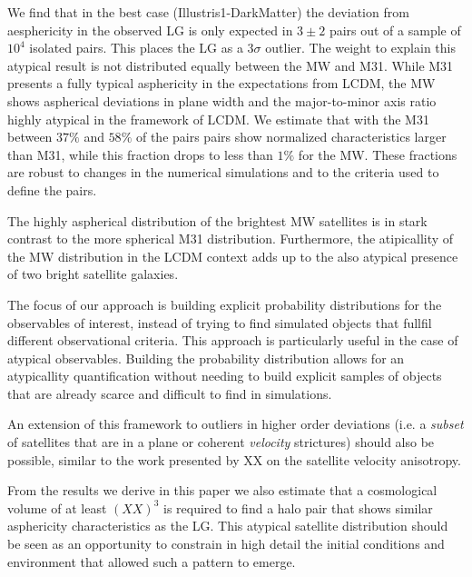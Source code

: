 \documentclass[a4paper,fleqn,usenatbib]{mnras}
\begin{document}
We find that in the best case (Illustris1-DarkMatter) the deviation
from aesphericity in the observed LG is only  expected in $3\pm2$
pairs out of a sample of $10^4$ isolated pairs. This places the LG as
a $3\sigma$ outlier.   
The weight to explain this atypical result is not distributed equally
between the MW and M31. 
While M31 presents a fully typical asphericity in the expectations
from LCDM, the MW shows aspherical deviations in plane width and the
major-to-minor axis ratio highly atypical in the 
framework of LCDM. 
We estimate that with the M31 between $37\%$ and $58\%$ of the pairs
pairs show normalized characteristics larger than M31, while
this fraction drops to less than $1\%$ for the MW.
These fractions are robust to changes in the numerical simulations and to
the criteria used to define the pairs.


The highly aspherical distribution of the brightest MW satellites is
in stark contrast to the more spherical M31 distribution.
Furthermore, the atipicallity of the MW distribution in the LCDM
context adds up to the also atypical presence of two bright satellite
galaxies.


The focus of our approach is building explicit probability
distributions for the observables of interest, instead of trying to
find simulated objects that fullfil different observational criteria. 
This approach is particularly useful in the case of atypical
observables. 
Building the probability distribution allows for an atypicallity
quantification without needing to build explicit samples of objects
that are already scarce and difficult to find in simulations.

An extension of this framework to outliers in higher order deviations
(i.e. a \emph{subset} of satellites that are in a plane or
coherent \emph{velocity} strictures) should also be possible, similar
to the work presented by XX on the satellite velocity anisotropy.

From the results we derive in this paper we also estimate that a
cosmological volume of at least $( XX )^3$ is required to find a halo pair
that shows similar asphericity characteristics as the LG. 
This atypical satellite distribution should be seen as an opportunity
to constrain in high detail the initial conditions and environment
that allowed such a pattern to emerge. 






\end{document}

